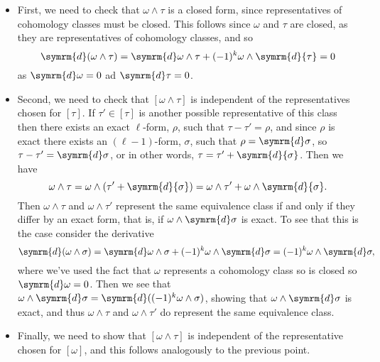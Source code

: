 \documentclass[fleqn]{NotesClass}
\renewcommand{\dl}{\symrm{d}}
\begin{document}
    \begin{itemize}
        \item First, we need to check that \(\omega \wedge \tau\) is a closed form, since representatives of cohomology classes must be closed.
        This follows since \(\omega\) and \(\tau\) are closed, as they are representatives of cohomology classes, and so
        \begin{equation}
            \dl (\omega \wedge \tau) = \dl \omega \wedge \tau + (-1)^k \omega \wedge \dl{\tau} = 0
        \end{equation}
        as \(\dl \omega = 0\) ad \(\dl \tau = 0\).
        \item Second, we need to check that \([\omega \wedge \tau]\) is independent of the representatives chosen for \([\tau]\).
        If \(\tau' \in [\tau]\) is another possible representative of this class then there exists an exact \(\ell\)-form, \(\rho\), such that \(\tau - \tau' = \rho\), and since \(\rho\) is exact there exists an \((\ell - 1)\)-form, \(\sigma\), such that \(\rho = \dl \sigma\), so \(\tau - \tau' = \dl \sigma\), or in other words, \(\tau = \tau' + \dl{\sigma}\).
        Then we have
        \begin{equation}
            \omega \wedge \tau = \omega \wedge (\tau' + \dl{\sigma}) = \omega \wedge \tau' + \omega \wedge \dl{\sigma}.
        \end{equation}
        Then \(\omega \wedge \tau\) and \(\omega \wedge \tau'\) represent the same equivalence class if and only if they differ by an exact form, that is, if \(\omega \wedge \dl \sigma\) is exact.
        To see that this is the case consider the derivative
        \begin{equation}
            \dl (\omega \wedge \sigma) = \dl \omega \wedge \sigma + (-1)^k \omega \wedge \dl \sigma = (-1)^k \omega \wedge \dl \sigma,
        \end{equation}
        where we've used the fact that \(\omega\) represents a cohomology class so is closed so \(\dl \omega = 0\).
        Then we see that \(\omega \wedge \dl \sigma = \dl((-1)^k \omega \wedge \sigma)\), showing that \(\omega \wedge \dl \sigma\) is exact, and thus \(\omega \wedge \tau\) and \(\omega \wedge \tau'\) do represent the same equivalence class.
        \item Finally, we need to show that \([\omega \wedge \tau]\) is independent of the representative chosen for \([\omega]\), and this follows analogously to the previous point.
    \end{itemize}
    
\end{document}
